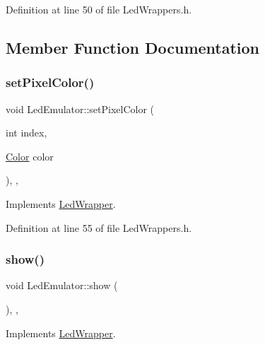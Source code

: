 Definition at line 50 of file Led\+Wrappers.\+h.



\subsection{Member Function Documentation}
\mbox{\label{class_led_emulator_a13ce7b61ea614d4d48f3a87c582b6148}} 
\subsubsection{\texorpdfstring{set\+Pixel\+Color()}{setPixelColor()}}
{\footnotesize\ttfamily void Led\+Emulator\+::set\+Pixel\+Color (\begin{DoxyParamCaption}\item[{int}]{index,  }\item[{\hyperlink{struct_color}{Color}}]{color }\end{DoxyParamCaption})\hspace{0.3cm}{\ttfamily [inline]}, {\ttfamily [override]}, {\ttfamily [virtual]}}



Implements \hyperlink{class_led_wrapper_ac20a5afaaaaa2c275d7f6008ace09c41}{Led\+Wrapper}.



Definition at line 55 of file Led\+Wrappers.\+h.

\mbox{\label{class_led_emulator_ad9a0629926516da0368b03d530a91815}} 
\subsubsection{\texorpdfstring{show()}{show()}}
{\footnotesize\ttfamily void Led\+Emulator\+::show (\begin{DoxyParamCaption}{ }\end{DoxyParamCaption})\hspace{0.3cm}{\ttfamily [inline]}, {\ttfamily [override]}, {\ttfamily [virtual]}}



Implements \hyperlink{class_led_wrapper_a82048b562a501a0a46e5953d2cdb2549}{Led\+Wrapper}.



